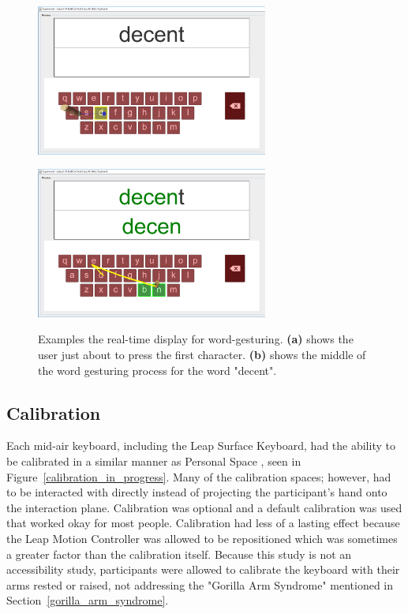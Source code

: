 \begin{figure}[h]
	\centering
	\begin{minipage}[t]{2.9in}
		\includegraphics[width=3in]{fig_update1_keyboard}
		\label{update_a}
	\end{minipage}
	\begin{minipage}[t]{2.9in}
		\includegraphics[width=3in]{fig_update2_keyboard}
		\label{update_b}
	\end{minipage}
	\caption[Display: Real-time Updates]{Examples the real-time display for word-gesturing. \textbf{(a)} shows the user just about to press the first character. \textbf{(b)} shows the middle of the word gesturing process for the word "decent".}
	\label{display_area}
\end{figure}

\subsection{Calibration}
Each mid-air keyboard, including the Leap Surface Keyboard, had the ability to be calibrated in a similar manner as Personal Space \cite{ref_alvin_thesis}, seen in Figure~\ref{calibration_in_progress}. Many of the calibration spaces; however, had to be interacted with directly instead of projecting the participant's hand onto the interaction plane. Calibration was optional and a default calibration was used that worked okay for most people. Calibration had less of a lasting effect because the Leap Motion Controller was allowed to be repositioned which was sometimes a greater factor than the calibration itself. Because this study is not an accessibility study, participants were allowed to calibrate the keyboard with their arms rested or raised, not addressing the "Gorilla Arm Syndrome" mentioned in Section~\ref{gorilla_arm_syndrome}.

